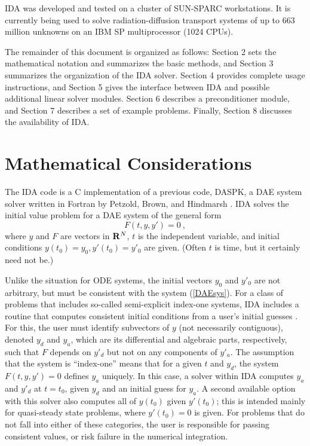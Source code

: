 \documentclass[11pt]{article}
\begin{document}
IDA was developed and tested on a cluster of SUN-SPARC
workstations.  It is currently being used to solve radiation-diffusion
transport systems of up to 663 million unknowns on an IBM SP multiprocessor 
(1024 CPUs).

The remainder of this document is organized as follows: Section 2 sets
the mathematical notation and summarizes the basic methods, and
Section 3 summarizes the organization of the IDA solver.  Section 4
provides complete usage instructions, and Section 5 gives the
interface between IDA and possible additional linear solver modules.
Section 6 describes a preconditioner module, and Section 7 describes a
set of example problems.  Finally, Section 8 discusses the
availability of IDA.


\section{Mathematical Considerations}

The IDA code is a C implementation of a previous code, DASPK, a DAE
system solver written in Fortran by Petzold, Brown, and Hindmarsh
\cite{BrHiPe94,BrCaPe96}.  IDA solves the initial value problem for 
a DAE system of the general form
\begin{equation}
  F(t,y,y') = 0 ~,    \label{DAEsys}
\end{equation}
where $y$ and $F$ are vectors in ${\bf R}^N$, $t$ is the independent
variable, and initial conditions $y(t_0) = y_0, y'(t_0) = y'_0$ are
given.  (Often $t$ is time, but it certainly need not be.)

Unlike the situation for ODE systems, the initial vectors $y_0$ and
$y'_0$ are not arbitrary, but must be consistent with the system
(\ref{DAEsys}).  For a class of problems that includes so-called
semi-explicit index-one systems, IDA includes a routine that computes
consistent initial conditions from a user's initial guesses
\cite{BrHiPe98}.  For this, the user must identify subvectors of $y$
(not necessarily contiguous), denoted $y_d$ and $y_a$, which are its
differential and algebraic parts, respectively, such that $F$ depends
on $y'_d$ but not on any components of $y'_a$.  The assumption that
the system is ``index-one'' means that for a given $t$ and $y_d$, the
system $F(t,y,y') = 0$ defines $y_a$ uniquely.  In this case, a solver
within IDA computes $y_a$ and $y'_d$ at $t = t_0$, given $y_d$ and an
initial guess for $y_a$.  A second available option with  this solver
also computes all of $y(t_0)$ given $y'(t_0)$; this is intended mainly
for quasi-steady state problems, where $y'(t_0) = 0$ is given.
For problems that do not fall into either of these categories, the
user is responsible for passing consistent values, or risk failure in
the numerical integration.
\end{document}
